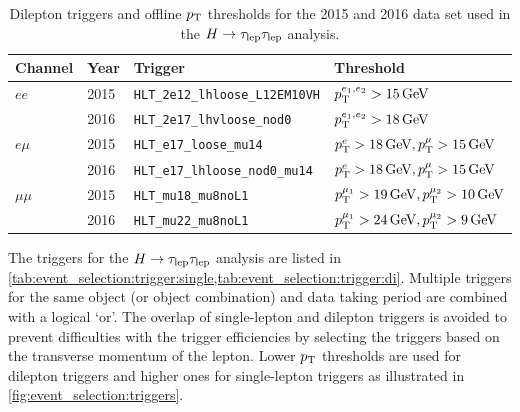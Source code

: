 \begin{table}[htpb]
    \centering
    \caption{Dilepton triggers and offline $p_\text{T}$ thresholds for the 2015 and 2016 data set used in the $H \to \tau_\text{lep} \tau_\text{lep}$ analysis.}\label{tab:event_selection:trigger:di}
    \begin{tabular}{@{}llll@{}}
        \toprule
        Channel  & Year & Trigger & Threshold \\ \midrule
        $ee$     & 2015 & \texttt{HLT\_2e12\_lhloose\_L12EM10VH} & $\pt^{e_1, e_2} > \unit[15]{GeV}$ \\
                 & 2016 & \texttt{HLT\_2e17\_lhvloose\_nod0} & $\pt^{e_1, e_2} > \unit[18]{GeV}$ \\ \cmidrule{1-4}
        $e\mu$   & 2015 & \texttt{HLT\_e17\_loose\_mu14} & $\pt^{e} > \unit[18]{GeV}, \pt^\mu > \unit[15]{GeV}$ \\
                 & 2016 & \texttt{HLT\_e17\_lhloose\_nod0\_mu14} & $\pt^{e} > \unit[18]{GeV}, \pt^\mu > \unit[15]{GeV}$ \\ \cmidrule{1-4}
        $\mu\mu$ & 2015 & \texttt{HLT\_mu18\_mu8noL1} & $\pt^{\mu_1} > \unit[19]{GeV}, \pt^{\mu_2} > \unit[10]{GeV}$ \\
                 & 2016 & \texttt{HLT\_mu22\_mu8noL1} & $\pt^{\mu_1} > \unit[24]{GeV}, \pt^{\mu_2} > \unit[9]{GeV}$ \\
        \bottomrule
    \end{tabular}
\end{table}

The triggers for the $H \to \tau_\text{lep} \tau_\text{lep}$ analysis are listed in \cref{tab:event_selection:trigger:single,tab:event_selection:trigger:di}.
Multiple triggers for the same object (or object combination) and data taking period are combined with a logical `or'.
The overlap of single-lepton and dilepton triggers is avoided to prevent difficulties with the trigger efficiencies
by selecting the triggers based on the transverse momentum of the lepton.
Lower $p_\text{T}$ thresholds are used for dilepton triggers and higher ones for single-lepton triggers as
illustrated in \cref{fig:event_selection:triggers}.

